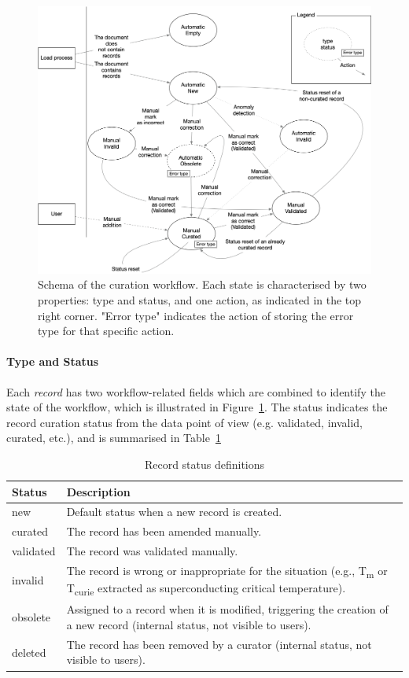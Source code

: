 \documentclass[a4paper]{article}
\begin{document}
\begin{figure}[ht]
  \centering
  \includegraphics[width=1\textwidth]{images/record-correction} 
  \caption{Schema of the curation workflow. Each state is characterised by two properties: type and status, and one action, as indicated in the top right corner. "Error type" indicates the action of storing the error type for that specific action.}
  \label{fig:curation-workflow}
\end{figure}

\paragraph{Type and Status} Each \textit{record} has two workflow-related fields which are combined to identify the state of the workflow, which is illustrated in Figure~\ref{fig:curation-workflow}. 
The status indicates the record curation status from the data point of view (e.g. validated, invalid, curated, etc.), and is summarised in Table~\ref{tab:record-status}

\begin{table}[htbp]
\centering
\begin{tabular}{|p{2cm}|p{10cm}|}
\hline
\textbf{Status} & \textbf{Description} \\
\hline
new & Default status when a new record is created. \\
\hline
curated & The record has been amended manually. \\
\hline
validated & The record was validated manually. \\
\hline
invalid & The record is wrong or inappropriate for the situation (e.g., T\textsubscript{m} or T\textsubscript{curie} extracted as superconducting critical temperature). \\
\hline
obsolete & Assigned to a record when it is modified, triggering the creation of a new record (internal status, not visible to users).\\
\hline
deleted & The record has been removed by a curator (internal status, not visible to users). \\
\hline
\end{tabular}
\caption{Record status definitions}
\label{tab:record-status}
\end{table}
    
\end{document}
